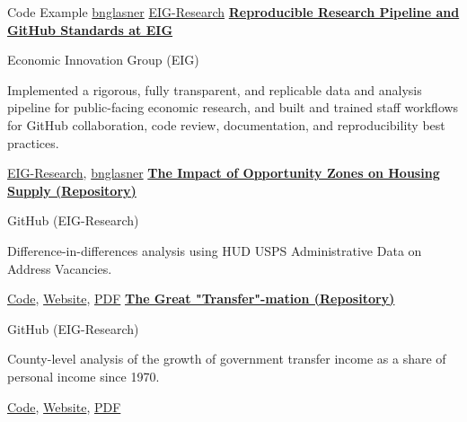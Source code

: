 \begin{rubric}{Code Example}
\entry*[Profiles]%
    \href{https://github.com/bnglasner}{bnglasner} \textbar{} \href{https://github.com/EIG-Research}{EIG-Research}
\entry*[2026]%
    \textbf{\href{https://github.com/EIG-Research}{Reproducible Research Pipeline and GitHub Standards at EIG}}
    \par Economic Innovation Group (EIG)
    \par Implemented a rigorous, fully transparent, and replicable data and analysis pipeline for public-facing economic research, and built and trained staff workflows for GitHub collaboration, code review, documentation, and reproducibility best practices.
    \par \href{https://github.com/EIG-Research}{EIG-Research}, \href{https://github.com/bnglasner}{bnglasner}
\entry*[2025]%
    \textbf{\href{https://github.com/EIG-Research/oz-housing-supply}{The Impact of Opportunity Zones on Housing Supply (Repository)}}
    \par GitHub (EIG-Research)
    \par Difference-in-differences analysis using HUD USPS Administrative Data on Address Vacancies.
    \par \href{https://github.com/EIG-Research/oz-housing-supply}{Code}, \href{https://eig.org/opportunity-zones-housing-supply/}{Website}, \href{https://eig.org/wp-content/uploads/2025/02/The_Impact_of_Opportunity_Zones_on_Housing_Supply.pdf}{PDF}
\entry*[2024]%
    \textbf{\href{https://github.com/EIG-Research/EIG-Great-Transfer-Mation}{The Great "Transfer"-mation (Repository)}}
    \par GitHub (EIG-Research)
    \par County-level analysis of the growth of government transfer income as a share of personal income since 1970.
    \par \href{https://github.com/EIG-Research/EIG-Great-Transfer-Mation}{Code}, \href{https://eig.org/great-transfermation/}{Website}, \href{https://eig.org/wp-content/uploads/2024/09/Great-Transfermation.pdf}{PDF}
\end{rubric}
